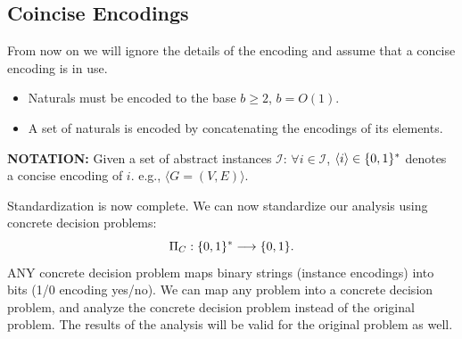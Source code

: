 
\subsection{Coincise Encodings}
From now on we will ignore the details of the encoding and assume that a concise encoding is in use.


\begin{itemize}
\item Naturals must be encoded to the base $b\geq2$, $b=O(1)$.
\item A set of naturals is encoded by concatenating the encodings of its elements.
\end{itemize}

\textbf{NOTATION:} Given a set of abstract instances $\mathcal I$:
$\forall i\in\mathcal I$, $\langle i\rangle\in\{0,1\}^*$ denotes a concise encoding of $i$.
e.g., $\langle G=(V,E)\rangle$.

Standardization is now complete. We can now standardize our analysis using concrete decision problems:
\[
\Pi_C:\{0,1\}^*\longrightarrow\{0,1\}.
\]
ANY concrete decision problem maps binary strings (instance encodings) into bits (1/0 encoding yes/no).
We can map any problem into a concrete decision problem, and analyze the concrete decision problem instead of the original problem. The results of the analysis will be valid for the original problem as well.

